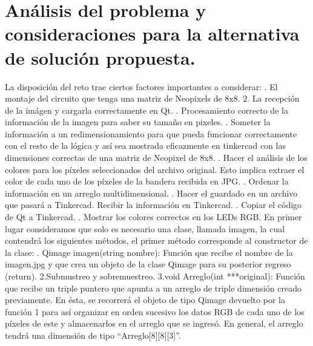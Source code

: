 \documentclass{article}
\begin{document}
\section{ Análisis del problema y consideraciones para la alternativa de solución propuesta.}
La disposición del reto trae ciertos factores importantes a considerar:
. El montaje del circuito que tenga una matriz de Neopixels de 8x8. 
2. La recepción de la imágen y cargarla correctamente en Qt.
. Procesamiento correcto de la información de la imagen para saber su tamaño en pixeles.
. Someter la información a un redimensionamiento para que pueda funcionar correctamente con el resto de la lógica y así sea mostrada eficazmente en tinkercad con las dimensiones correctas de una matriz de Neopixel de 8x8.
. Hacer el análisis de los colores para los píxeles seleccionados del archivo original. Esto implica extraer el color de cada uno de los píxeles de la bandera recibida en JPG. 
. Ordenar la información en un arreglo multidimensional.
. Hacer el guardado en un archivo que pasará a Tinkercad.
Recibir la información en Tinkercad.
. Copiar el código de Qt a Tinkercad. 
. Mostrar los colores correctos en los LEDs RGB.
\newline
\newline
En primer lugar consideramos que solo es necesario una clase, llamada imagen, la cual contendrá los siguientes métodos, el primer método corresponde al constructor de la clase:
. Qimage imagen(string nombre): Función que recibe el nombre de la imagen.jpg y que crea un objeto de la clase Qimage para su posterior regreso (return).
\newline
2.Submustreo y sobremuestreo.
\newline
3.void Arreglo(int ***original): Función que recibe un triple puntero que apunta a un arreglo de triple dimensión creado previamente. En ésta, se recorrerá el objeto de tipo Qimage devuelto por la función 1 para así organizar en orden sucesivo los datos RGB de cada uno de los píxeles de este y almacenarlos en el arreglo que se ingresó. En general, el arreglo tendrá una dimensión de tipo “Arreglo[8][8][3]”.
\end{document}
